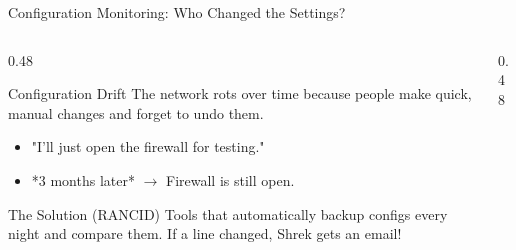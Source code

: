 \documentclass[aspectratio=169]{beamer}  %
\begin{document}
\begin{frame}{Configuration Monitoring: Who Changed the Settings?}
    \begin{columns}[T]
        \begin{column}{0.48\textwidth}
            \begin{block}{Configuration Drift}
                \footnotesize
                The network rots over time because people make quick, manual changes and forget to undo them.
                \begin{itemize}
                    \item "I'll just open the firewall for testing."
                    \item *3 months later* $\rightarrow$ Firewall is still open.
                \end{itemize}
            \end{block}
            \begin{exampleblock}{The Solution (RANCID)}
                \footnotesize
                Tools that automatically backup configs every night and compare them. If a line changed, Shrek gets an email!
            \end{exampleblock}
        \end{column}
        \begin{column}{0.48\textwidth}
            \begin{center}
            \end{center}
        \end{column}
    \end{columns}
\end{frame}
\end{document}
